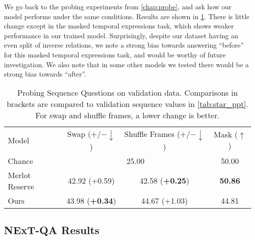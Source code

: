 We go back to the probing experiments from \cref{chap:probe}, and ask how our
model performs under the same conditions. Results are shown in
\cref{tab:probe_final}. There is little change except in the masked temporal
expressions task, which shows weaker performance in our trained model.
Surprisingly, despite our dataset having an even split of inverse relations, we
note a strong bias towards answering ``before'' for this masked temporal
expressions task, and would be worthy of future investigation. We also note
that in some other models we tested there would be a strong bias towards
``after''.

\begin{table}[t]
	\centering
	\caption{Probing Sequence Questions on validation data. Comparisons in
	brackets are compared to validation sequence values in \cref{tab:star_ppt}.
	For swap and shuffle frames, a lower change is better.}
	\label{tab:probe_final}
	\begin{tabular}{lccc}
	\toprule
	Model & Swap ($+/-\downarrow$) & Shuffle Frames ($+/-\downarrow$) & Mask ($\uparrow$) \\
	\cmidrule(r){1-1}             \cmidrule(){2-3} \cmidrule(l){4-4}
	Chance			& \multicolumn{2}{c}{25.00} & 50.00 \\
        \cmidrule(r){1-1}             \cmidrule(){2-3} \cmidrule(l){4-4}
		Merlot Reserve & 42.92 (+0.59) & 42.58 (\textbf{+0.25})  & \textbf{50.86} \\
		Ours & 43.98 (\textbf{+0.34}) & 44.67 (+1.03) & 44.81 \\
	\bottomrule
	\end{tabular}
\end{table}

\subsection{NExT-QA Results}
\label{sec:nextqa_results}

